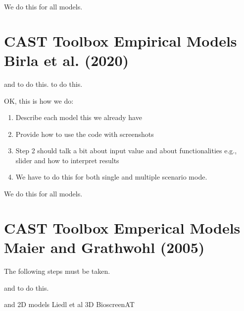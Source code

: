 \documentclass[letterpaper,10pt,english]{sphinxmanual}
\begin{document}
\sphinxAtStartPar
We do this for all models.


\section{CAST Toolbox \sphinxhyphen{} Empirical Models \sphinxhyphen{} Birla et al. (2020)}
\label{\detokenize{contents/toolbox/em_model/birla2020:cast-toolbox-empirical-models-birla-et-al-2020}}\label{\detokenize{contents/toolbox/em_model/birla2020::doc}}
\sphinxAtStartPar
{} and  to do this. to do this.

\sphinxAtStartPar
OK, this is how we do:
\begin{enumerate}
%
\item {} 
\sphinxAtStartPar
Describe each model \sphinxhyphen{} this we already have

\item {} 
\sphinxAtStartPar
Provide how to use the code with screenshots

\item {} 
\sphinxAtStartPar
Step 2 should talk a bit about input value and about functionalities \sphinxhyphen{} e.g., slider and how to interpret results

\item {} 
\sphinxAtStartPar
We have to do this for both single and multiple scenario mode.

\end{enumerate}

\sphinxAtStartPar
We do this for all models.


\section{CAST Toolbox \sphinxhyphen{} Emperical Models \sphinxhyphen{} Maier and Grathwohl (2005)}
\label{\detokenize{contents/toolbox/em_model/mg2005:cast-toolbox-emperical-models-maier-and-grathwohl-2005}}\label{\detokenize{contents/toolbox/em_model/mg2005::doc}}
\sphinxAtStartPar
The following steps must be taken.

\sphinxAtStartPar
{} and  to do this.

\sphinxAtStartPar
{} and  \sphinxhyphen{} 2D models
 Liedl et al 3D
 Bioscreen\sphinxhyphen{}AT
\end{document}
